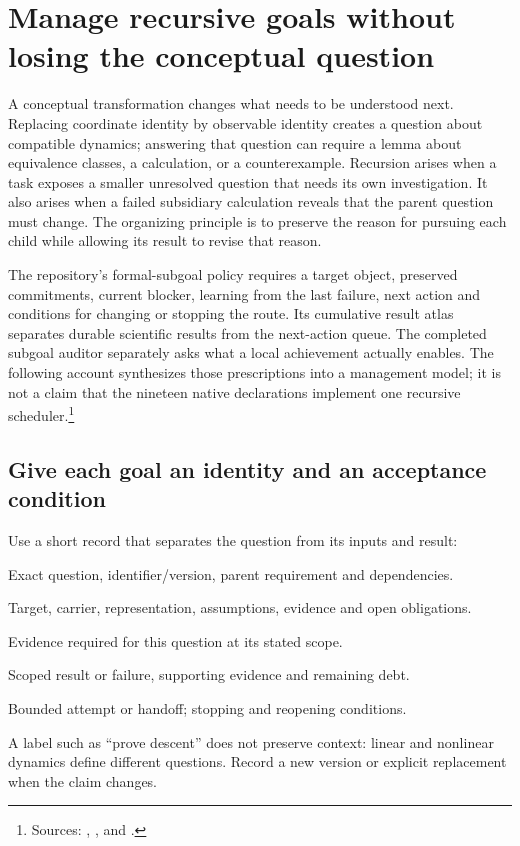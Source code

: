 %
%
%
\section{Manage recursive goals without losing the conceptual question}
\label{sec:recursive-goals}
A conceptual transformation changes what needs to be understood next. Replacing
coordinate identity by observable identity creates a question about compatible
dynamics; answering that question can require a lemma about equivalence classes,
a calculation, or a counterexample. Recursion arises when a task exposes a
smaller unresolved question that needs its own investigation. It also arises
when a failed subsidiary calculation reveals that the parent question must change.
The organizing principle is to preserve the reason for pursuing each child while
allowing its result to revise that reason.

The repository's formal-subgoal policy requires a target object, preserved
commitments, current blocker, learning from the last failure, next action and
conditions for changing or stopping the route. Its cumulative result atlas
separates durable scientific results from the next-action queue. The completed
subgoal auditor separately asks what a local achievement actually enables.
The following account synthesizes those prescriptions into a management model;
it is not a claim that the nineteen native declarations implement one recursive
scheduler.\footnote{\raggedright Sources: ,
, and
.}

\subsection{Give each goal an identity and an acceptance condition}
Use a short record that separates the question from its inputs and result:
\begin{description}[style=nextline,leftmargin=1.7cm,labelwidth=1.5cm,itemsep=1pt,parsep=0pt,topsep=4pt]
\item[Goal] Exact question, identifier/version, parent requirement and dependencies.
\item[Input] Target, carrier, representation, assumptions, evidence and open obligations.
\item[Accept] Evidence required for this question at its stated scope.
\item[Output] Scoped result or failure, supporting evidence and remaining debt.
\item[Next] Bounded attempt or handoff; stopping and reopening conditions.
\end{description}
A label such as ``prove descent'' does not preserve context: linear and nonlinear
dynamics define different questions. Record a new version or explicit replacement
when the claim changes.

